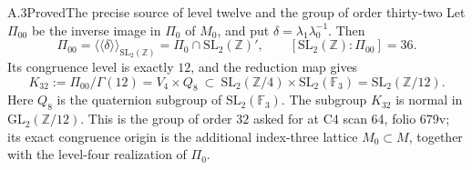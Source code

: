 \begin{statement}{A.3}{Proved}{The precise source of level twelve and the group of order thirty-two}
Let $\Pi_{00}$ be the inverse image in $\Pi_0$ of $M_0$, and put
$\delta=\lambda_1\lambda_0^{-1}$. Then
\[
 \Pi_{00}=\langle\!\langle\delta\rangle\!\rangle_{\mathrm{SL}_2(\mathbb Z)}
 =\Pi_0\cap\mathrm{SL}_2(\mathbb Z)',\qquad
 [\mathrm{SL}_2(\mathbb Z):\Pi_{00}]=36.
\]
Its congruence level is exactly $12$, and the reduction map gives
\[
 K_{32}:=\Pi_{00}/\Gamma(12)
 =V_4\times Q_8
 \ \subset\ \mathrm{SL}_2(\mathbb Z/4)\times\mathrm{SL}_2(\mathbb F_3)
 =\mathrm{SL}_2(\mathbb Z/12).
\]
Here $Q_8$ is the quaternion subgroup of $\mathrm{SL}_2(\mathbb F_3)$.
The subgroup $K_{32}$ is normal in $\mathrm{GL}_2(\mathbb Z/12)$.
This is the group of order $32$ asked for at C4 scan 64, folio 679v;
its exact congruence origin is the additional index-three lattice
$M_0\subset M$, together with the level-four realization of $\Pi_0$.
\end{statement}
